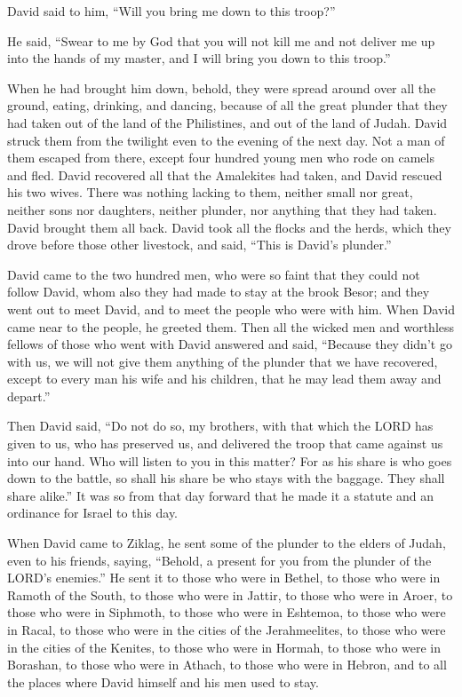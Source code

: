 \myverse{}David said to him, “Will you bring me down to this troop?”

He said, “Swear to me by God that you will not kill me and not deliver me up into the hands
of my master, and I will bring you down to this troop.”

\myverse{}When he had brought him down, behold, they were spread around
over all the ground, eating, drinking, and dancing, because of all the great plunder that they had taken
out of the land of the Philistines, and out of the land of Judah.
\myverse{}David struck them from the twilight even to the evening of the next day.
Not a man of them escaped from there, except four hundred young men who rode on camels and fled.
\myverse{}David recovered all that the Amalekites had taken, and David rescued his
two wives.
\myverse{}There was nothing lacking to them, neither small nor great, neither sons
nor daughters, neither plunder, nor anything that they had taken. David brought them all back.
\myverse{}David took all the flocks and the herds, which they drove before those other
livestock, and said, “This is David’s plunder.”

\myverse{}David came to the two hundred men, who were so faint that they
could not follow David, whom also they had made to stay at the brook Besor; and they went out to meet
David, and to meet the people who were with him. When David came near to the people, he greeted them.
\myverse{}Then all the wicked men and worthless fellows of those who went with David
answered and said, “Because they didn’t go with us, we will not give them anything of the plunder that
we have recovered, except to every man his wife and his children, that he may lead them away and depart.”

\myverse{}Then David said, “Do not do so, my brothers, with that which
the LORD has given to us, who has preserved us, and delivered the troop that came against us into our
hand.
\myverse{}Who will listen to you in this matter? For as his share is who goes down
to the battle, so shall his share be who stays with the baggage. They shall share alike.”
\myverse{}It was so from that day forward that he made it a statute and an ordinance
for Israel to this day.

\myverse{}When David came to Ziklag, he sent some of the plunder to the
elders of Judah, even to his friends, saying, “Behold, a present for you from the plunder of the LORD’s
enemies.”
\myverse{}He sent it to those who were in Bethel, to those who were in Ramoth of the
South, to those who were in Jattir,
\myverse{}to those who were in Aroer, to those who were in Siphmoth, to those who were
in Eshtemoa,
\myverse{}to those who were in Racal, to those who were in the cities of the Jerahmeelites,
to those who were in the cities of the Kenites,
\myverse{}to those who were in Hormah, to those who were in Borashan, to those who
were in Athach,
\myverse{}to those who were in Hebron, and to all the places where David himself and
his men used to stay.


